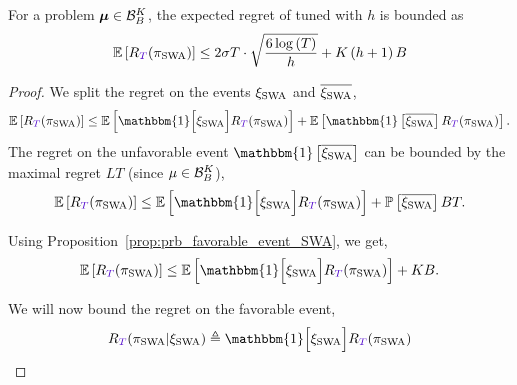 \begin{proposition}
\label{prop:SWA}
 For a problem ${\boldsymbol \mu} \in \mathcal{B}_{B}^K$, the expected regret of \SWA tuned with $h$ is bounded as
 \[
\EE{ \regret(\piSWA)} \leq 2\sigma T\cdot\sqrt{\frac{6\log\pa{T}}{h}} + K\pa{h+1}B
 \]
\end{proposition}

\begin{proof}
We split the regret on the events $\xi_{\rm SWA}$ and $\overline{\xi_{\rm SWA}}$, 
\[
\EE{\regret(\piSWA)} \leq \EE{\mathbbm{1} \Big[\HPSWA\Big] \regret(\piSWA)} + \EE{\mathbbm{1} \left[\bar{\HPSWA}\right] \regret(\piSWA)}.
\]
The regret on the unfavorable event $\mathbbm{1} \left[\bar{\HPSWA}\right]$ can be bounded by the maximal regret $LT$ (since $\mu \in \mathcal{B}_{B}^K$), 
\[
\EE{\regret(\piSWA)} \leq  \EE{\mathbbm{1} \Big[\HPSWA\Big] \regret(\piSWA)} + \PP{\bar{\HPSWA}} BT.
\]

Using Proposition~\ref{prop:prb_favorable_event_SWA}, we get,
\begin{equation}
\label{eq:regret-unfav-event-SWA}
\EE{\regret(\piSWA)} \leq  \EE{\mathbbm{1} \Big[\HPSWA\Big]  \regret(\piSWA)} + KB.
\end{equation}


We will now bound the regret on the favorable event,
\[
\regret(\piSWA | \HPSWA) \triangleq \mathbbm{1} \Big[\HPSWA\Big]  \regret(\piSWA)
\]


\end{proof}
